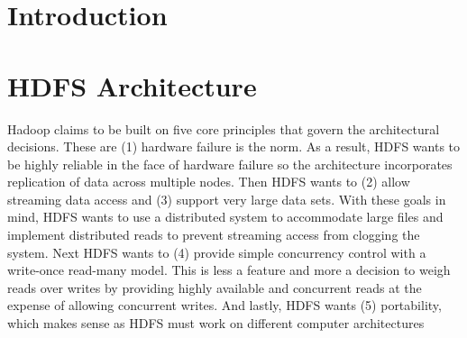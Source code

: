\documentclass[11pt, a4paper]{article}
\author{\theauthor}
\title{\thetitle}
\date{\duedate}
\begin{document}
\maketitle
\thispagestyle{empty}

\begin{abstract}
\end{abstract}
\begin{multicols*}{2}


\section{Introduction}



\section{HDFS Architecture}



Hadoop claims to be built on five core principles that govern the architectural decisions. These are (1) hardware failure is the norm. As a result, HDFS wants to be highly reliable in the face of hardware failure so the architecture incorporates replication of data across multiple nodes. Then HDFS wants to (2) allow streaming data access and (3) support very large data sets. With these goals in mind, HDFS wants to use a distributed system to accommodate large files and implement distributed reads to prevent streaming access from clogging the system. Next HDFS wants to (4) provide simple concurrency control with a write-once read-many model. This is less a feature and more a decision to weigh reads over writes by providing highly available and concurrent reads at the expense of allowing concurrent writes. And lastly, HDFS wants (5) portability, which makes sense as HDFS must work on different computer architectures 



\end{multicols*}
\end{document}
